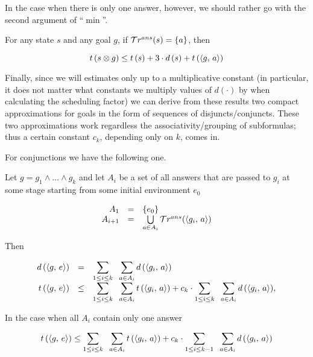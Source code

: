 In the case when there is only one answer, however, we should rather go with the second argument of ``$\min$''.

\begin{corollary}
\label{lem:prod_estimation_single_answer}
  For any state $s$ and any goal $g$, if $\mathcal{T}r^{ans}(s) = \{a\}$, then
  
\[ t\,(s \otimes g) \le t\,(s) + 3\cdot d\,(s) + t\,(\langle g ,\, a \rangle) \]
\end{corollary}

Finally, since we will estimates only up to a multiplicative constant (in particular, it does not matter what constants we multiply values of $d(\cdot)$ by when calculating the scheduling factor) we can derive from these results two compact approximations for goals in the form of sequences of disjuncts/conjuncts. These two approximations work regardless the associativity/grouping of subformulas; thus a certain constant $c_k$, depending only on $k$, comes in.

For conjunctions we have the following one.

\begin{lemma}
\label{lem:conjunction_metrics_calc}

Let $g = g_1 \land \dots \land g_k$ and let $A_i$ be a set of all answers that are passed to $g_i$ at some stage starting from some initial environment $e_0$

\[
\begin{array}{rcl}
A_1 &=& \{ e_0 \} \\
A_{i + 1} & = & \bigcup\limits_{a \in A_i} \mathcal{T}r^{ans}(\langle g_i ,\, a \rangle) 
\end{array}
\]

Then

\[
\begin{array}{rcl}
d\,(\langle g ,\, e \rangle) &=& \displaystyle\sum\limits_{1 \le i \le k} \;\; \displaystyle\sum\limits_{a \in A_i} d\,(\langle g_i ,\, a \rangle) \\
t\,(\langle g ,\, e \rangle) &\le& \displaystyle\sum\limits_{1 \le i \le k} \;\; \displaystyle\sum\limits_{a \in A_i} t\,(\langle g_i ,\, a \rangle) + c_k \cdot \displaystyle\sum\limits_{1 \le i \le k} \;\; \displaystyle\sum\limits_{a \in A_i} d\,(\langle g_i ,\, a \rangle), \\
\end{array}
\]

In the case when all $A_i$ contain only one answer

\[
t\,(\langle g ,\, e \rangle) \le \displaystyle\sum\limits_{1 \le i \le k} \;\; \displaystyle\sum\limits_{a \in A_i} t\,(\langle g_i ,\, a \rangle) + c_k \cdot \displaystyle \sum\limits_{1 \le i \le k - 1} \;\; \displaystyle\sum\limits_{a \in A_i} d\,(\langle g_i ,\, a \rangle)
\]

\end{lemma}


